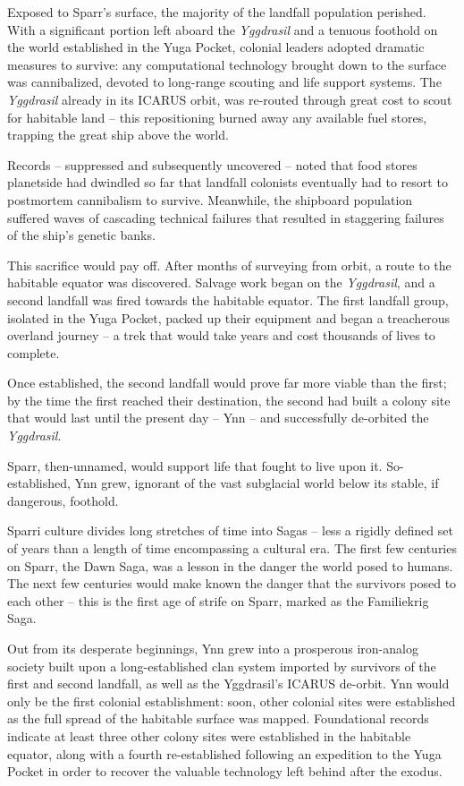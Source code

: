 Exposed to Sparr’s surface, the majority of the landfall population perished. With a significant
portion left aboard the \textit{Yggdrasil} and a tenuous foothold on the world established in the Yuga
Pocket, colonial leaders adopted dramatic measures to survive: any computational technology
brought down to the surface was cannibalized, devoted to long-range scouting and life support
systems. The \textit{Yggdrasil} already in its ICARUS orbit, was re-routed through great cost to scout for
habitable land -- this repositioning burned away any available fuel stores, trapping the great ship
above the world.

Records -- suppressed and subsequently uncovered -- noted that food stores planetside had
dwindled so far that landfall colonists eventually had to resort to postmortem cannibalism to
survive. Meanwhile, the shipboard population suffered waves of cascading technical failures that
resulted in staggering failures of the ship’s genetic banks.

This sacrifice would pay off. After months of surveying from orbit, a route to the habitable equator
was discovered. Salvage work began on the \textit{Yggdrasil}, and a second landfall was fired towards
the habitable equator. The first landfall group, isolated in the Yuga Pocket, packed up their
equipment and began a treacherous overland journey -- a trek that would take years and cost
thousands of lives to complete.

Once established, the second landfall would prove far more viable than the first; by the time the
first reached their destination, the second had built a colony site that would last until the present
day -- Ynn -- and successfully de-orbited the \textit{Yggdrasil}.

Sparr, then-unnamed, would support life that fought to live upon it. So-established, Ynn grew,
ignorant of the vast subglacial world below its stable, if dangerous, foothold.

Sparri culture divides long stretches of time into Sagas -- less a rigidly defined set of years than a
length of time encompassing a cultural era. The first few centuries on Sparr, the Dawn Saga, was
a lesson in the danger the world posed to humans. The next few centuries would make known the
danger that the survivors posed to each other -- this is the first age of strife on Sparr, marked as
the Familiekrig Saga.

Out from its desperate beginnings, Ynn grew into a prosperous iron-analog society built upon a
long-established clan system imported by survivors of the first and second landfall, as well as the
Yggdrasil’s ICARUS de-orbit. Ynn would only be the first colonial establishment: soon, other
colonial sites were established as the full spread of the habitable surface was mapped.
Foundational records indicate at least three other colony sites were established in the habitable
equator, along with a fourth re-established following an expedition to the Yuga Pocket in order to
recover the valuable technology left behind after the exodus.

